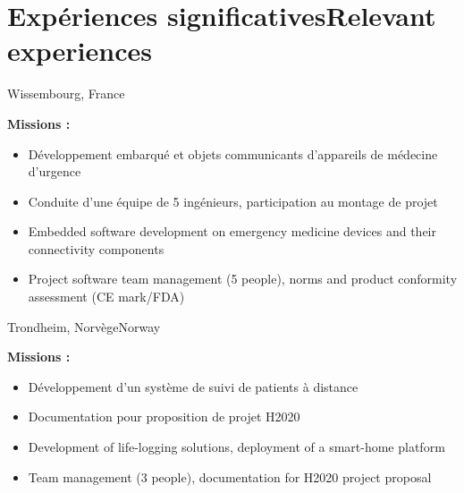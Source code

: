 \section{\ifnativelang Exp\'eriences significatives\else Relevant experiences\fi}

{}{}{Wissembourg, France}{
\textcolor{color1}{\textbf{Missions :}}
\begin{itemize}
\ifnativelang
\item Développement embarqué et objets communicants d’appareils de médecine d’urgence
\item Conduite d’une équipe de 5 ingénieurs, participation au montage de projet
\else
\item Embedded software development on emergency medicine devices and their connectivity components
\item Project software team management (5 people),  norms and product conformity assessment (CE mark/FDA)
\fi
\end{itemize}
}



\vspace{\ItemsSpacing}

{}{}{Trondheim, \ifnativelang Norv\`ege\else Norway \fi}{
\textcolor{color1}{\textbf{Missions :}}
\begin{itemize}
\ifnativelang
\item Développement d’un système de suivi de patients à distance
\item Documentation pour proposition de projet H2020
\else
\item Development of life-logging solutions, deployment of a smart-home platform
\item Team management (3 people), documentation for H2020 project proposal
\fi
\end{itemize}
}


